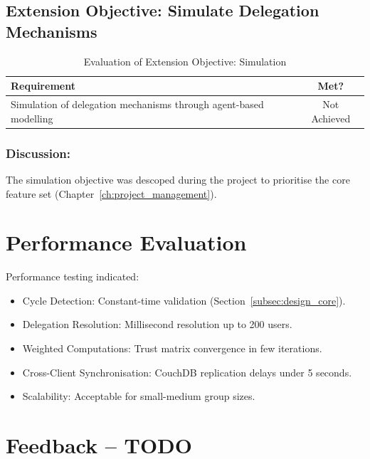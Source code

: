 \subsection{Extension Objective: Simulate Delegation Mechanisms}

\begin{table}[H]
\centering
\begin{tabular}{|p{9cm}|c|}
\hline
\textbf{Requirement} & \textbf{Met?} \\ \hline
Simulation of delegation mechanisms through agent-based modelling & Not Achieved \\ \hline
\end{tabular}
\caption{Evaluation of Extension Objective: Simulation}
\label{tab:objective5_requirements}
\end{table}

\vspace{1em}

\noindent \subsubsection{Discussion:}

The simulation objective was descoped during the project to prioritise the core feature set (Chapter~\ref{ch:project_management}).

\section{Performance Evaluation}

Performance testing indicated:

\begin{itemize}
    \item Cycle Detection: Constant-time validation (Section~\ref{subsec:design_core}).
    \item Delegation Resolution: Millisecond resolution up to 200 users.
    \item Weighted Computations: Trust matrix convergence in few iterations.
    \item Cross-Client Synchronisation: CouchDB replication delays under 5 seconds.
    \item Scalability: Acceptable for small-medium group sizes.
\end{itemize}

\section{Feedback -- TODO}

